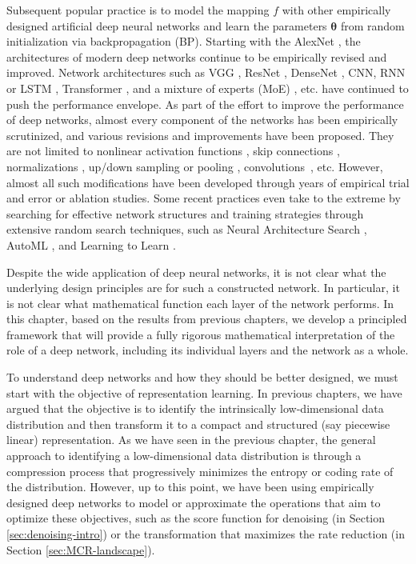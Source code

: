 \documentclass[\toplevelprefix/book-main.tex]{subfiles}
\begin{document}
Subsequent popular practice is to model the mapping $f$ with other empirically designed artificial deep neural networks and learn the parameters $\bm \theta$ from random initialization via backpropagation (BP). Starting with the AlexNet \cite{krizhevsky2012imagenet}, the architectures of modern deep networks continue to be empirically revised and improved. Network architectures such as VGG \cite{simonyan2014very}, ResNet \cite{he2016deep}, DenseNet \cite{dense-net}, CNN, RNN or LSTM \cite{LSTM}, Transformer \cite{vaswani2017attention}, and a mixture of experts (MoE) \cite{MoE,Fedus-2022}, etc. have continued to push the performance envelope. As part of the effort to improve the performance of deep networks, almost every component of the networks has been empirically scrutinized, and various revisions and improvements have been proposed. They are not limited to nonlinear activation functions \cite{maas2013rectifier,klambauer2017self,xu2015empirical,nwankpa2018activation}, skip connections \cite{ronneberger2015u,he2016deep}, normalizations \cite{ioffe2015batch,ba2016layer,ulyanov2016instance,wu2018group,miyato2018spectral}, up/down sampling or pooling \cite{scherer2010evaluation}, convolutions~\cite{lecun1998gradient,krizhevsky2012imagenet}, etc.
However, almost all such modifications have been developed through years of empirical {trial and error} or ablation studies. Some recent practices even take to the extreme by searching for effective network structures and training strategies through extensive random search techniques, such as Neural Architecture Search \cite{NAS-1,Baker2017DesigningNN}, AutoML \cite{automl}, and Learning to Learn \cite{andrychowicz2016learning}. 

Despite the wide application of deep neural networks, it is not clear what the underlying design principles are for such a constructed network. In particular, it is not clear what mathematical function each layer of the network performs. In this chapter, based on the results from previous chapters, we develop a principled framework that will provide a fully rigorous mathematical interpretation of the role of a deep network, including its individual layers and the network as a whole. 

To understand deep networks and how they should be better designed, we must start with the objective of representation learning. In previous chapters, we have argued that the objective is to identify the intrinsically low-dimensional data distribution and then transform it to a compact and structured (say piecewise linear) representation. As we have seen in the previous chapter, the general approach to identifying a low-dimensional data distribution is through a compression process that progressively minimizes the entropy or coding rate of the distribution. However, up to this point, we have been using empirically designed deep networks to model or approximate the operations that aim to optimize these objectives, such as the score function for denoising (in Section \ref{sec:denoising-intro}) or the transformation that maximizes the rate reduction (in Section \ref{sec:MCR-landscape}). 
\end{document}
